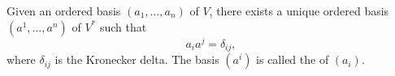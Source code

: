 Given an ordered basis $(a_1, \ldots, a_n)$ of $V$, there exists a unique ordered basis $(a^1, \ldots, a^n)$ of $V^*$ such that
$$
a_i a^j = \delta_{ij},
$$
where $\delta_{ij}$ is the Kronecker delta. The basis $(a^i)$ is called the  of $(a_i)$.
